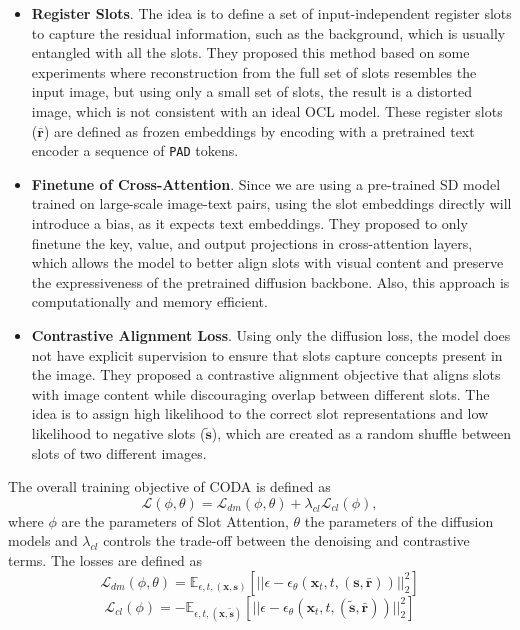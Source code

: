 \begin{itemize}
    \item \textbf{Register Slots}. The idea is to define a set of input-independent register slots to capture the residual information, such as the background, which is usually entangled with all the slots. They proposed this method based on some experiments where reconstruction from the full set of slots resembles the input image, but using only a small set of slots, the result is a distorted image, which is not consistent with an ideal OCL model. These register slots ($\mathbf{\bar r}$) are defined as frozen embeddings by encoding with a pretrained text encoder a sequence of \texttt{PAD} tokens. 
    \item \textbf{Finetune of Cross-Attention}. Since we are using a pre-trained SD model trained on large-scale image-text pairs, using the slot embeddings directly will introduce a bias, as it expects text embeddings. They proposed to only finetune the key, value, and output projections in cross-attention layers, which allows the model to better align slots with visual content and preserve the expressiveness of the pretrained diffusion backbone. Also, this approach is computationally and memory efficient. 
    \item \textbf{Contrastive Alignment Loss}. Using only the diffusion loss, the model does not have explicit supervision to ensure that slots capture concepts present in the image. They proposed a contrastive alignment objective that aligns slots with image content while discouraging overlap between different slots. The idea is to assign high likelihood to the correct slot representations and low likelihood to negative slots ($\mathbf{\tilde s}$), which are created as a random shuffle between slots of two different images. 
\end{itemize} 
The overall training objective of CODA is defined as 
\begin{equation}
    \mathcal{L}(\phi, \theta) = \mathcal{L}_{dm}(\phi,\theta) + \lambda_{cl}\mathcal{L}_{cl}(\phi),
\end{equation}
where $\phi$ are the parameters of Slot Attention, $\theta$ the parameters of the diffusion models and $\lambda_{cl}$ controls the trade-off between the denoising and contrastive terms. The losses are defined as 
\begin{equation}
    \mathcal{L}_{dm}(\phi,\theta) = \mathbb{E}_{\epsilon, t, (\mathbf{x},\mathbf{s})} \left[ ||\epsilon - \epsilon_{\theta}(\mathbf{x}_t, t, (\mathbf{s},\mathbf{\bar r}))||^2_2 \right]
\end{equation}
\begin{equation}
    \mathcal{L}_{cl}(\phi) = -\mathbb{E}_{\epsilon, t, (\mathbf{x},\mathbf{\tilde s})} \left[ ||\epsilon - \epsilon_{\theta}(\mathbf{x}_t, t, (\mathbf{\tilde s},\mathbf{\bar r}))||^2_2 \right]
\end{equation}


